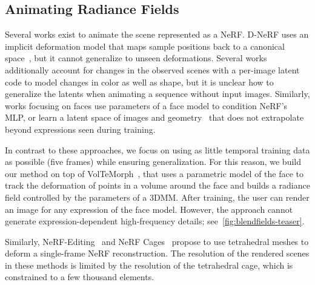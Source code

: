   \subsection{Animating Radiance Fields}
    Several works exist to animate the scene represented as a NeRF.
    D-NeRF uses an implicit deformation model that maps sample positions back to a
    canonical space~\cite{pumarola2021d}, but it cannot generalize to unseen
    deformations.
    Several works \cite{park2021nerfies, park2021hypernerf, gafni2021dynamic,
      tretschk2021non} additionally account for changes in the observed scenes with
    a per-image latent code to model changes in color as well as shape, but it is
    unclear how to generalize the latents when animating a sequence without input
    images.
    Similarly, works focusing on faces
    \cite{gafni2021dynamic,athar2022rignerf,zhuang2021mofanerf,gao2022reconstructing}
    use parameters of a face model to condition NeRF's MLP, or learn a latent
    space of images and
    geometry~\cite{cao2022authentic,wang2022morf,lombardi2019neural,mihajlovic2022keypointnerf,ma2021pixel,lombardi2021mixture}
    that does not extrapolate beyond expressions seen during training.

    In contrast to these approaches, we focus on using as little temporal training
    data as possible (\ie five frames) while ensuring generalization.
    For this reason, we build our method on top of
    VolTeMorph~\cite{garbin2024voltemorph}, that uses a parametric model of the
    face to track the deformation of points in a volume around the face and builds
    a radiance field controlled by the parameters of a 3DMM.
    After training, the user can render an image for any expression of the face
    model.
    However, the approach cannot generate expression-dependent high-frequency
    details; see~\cref{fig:blendfields-teaser}.

    Similarly, NeRF-Editing~\cite{yuan2022nerf} and NeRF
    Cages~\cite{xu2022deforming} propose to use tetrahedral meshes to deform a
    single-frame NeRF reconstruction.
    The resolution of the rendered scenes in these methods is limited by the
    resolution of the tetrahedral cage, which is constrained to a few thousand
    elements.

